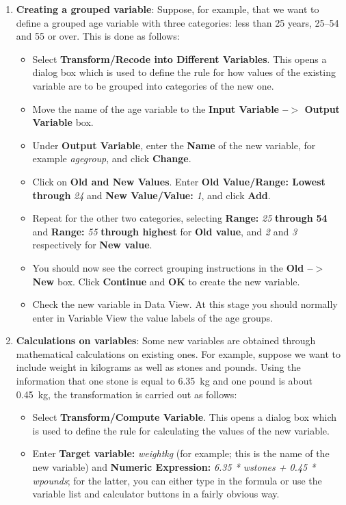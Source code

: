 \begin{enumerate}
\begin{enumerate}
\item
\textbf{Creating a grouped variable}:
Suppose, for example, that we want to define a grouped age variable
with three categories: less than 25 years, 25--54 and 55 or over. This is done
as follows:
\begin{itemize}
\item
Select \textbf{Transform/Recode into Different
Variables}. This opens a dialog box which is used to define the rule for
how values of the existing variable are to be grouped
into categories of the new one.
\item
Move the name of the age
variable to the \textbf{Input Variable --$>$ Output Variable} box.
\item
Under \textbf{Output Variable}, enter
the \textbf{Name} of the new variable, for example
\emph{agegroup}, and click \textbf{Change}.
\item
Click on \textbf{Old and New Values}. Enter \textbf{Old Value/Range:
Lowest through} \emph{24} and \textbf{New Value/Value:} \emph{1}, and
click \textbf{Add}.
\item
Repeat for the other two categories, selecting
\textbf{Range:} \emph{25} \textbf{through} \textbf{54} and
\textbf{Range:} \emph{55} \textbf{through highest}
for \textbf{Old value}, and \emph{2} and \emph{3} respectively
for \textbf{New value}.
\item
You should now see the correct grouping instructions in the \textbf{Old
--$\mathbf{>}$ New} box. Click \textbf{Continue} and \textbf{OK} to
create the new variable.
\item
Check the new variable in Data View. At this stage
you should normally enter in Variable View the value labels of the age
groups.
\end{itemize}
\item
\textbf{Calculations on variables}: Some new variables are obtained
through mathematical calculations on existing ones. For example, suppose
we want to include weight in kilograms as well as stones and pounds.
Using the information that one stone is equal to 6.35~kg and one pound
is about 0.45~kg, the transformation is carried out as follows:
\begin{itemize}
\item
Select \textbf{Transform/Compute Variable}. This opens a dialog box which is
used to define the rule for calculating the values of the new variable.
\item
Enter \textbf{Target variable:} \emph{weightkg} (for example; this is
the name of the new variable) and
\textbf{Numeric Expression:} \emph{6.35 * wstones + 0.45 * wpounds}; for
the latter, you can either type in the formula or use the variable list and
calculator buttons in a fairly obvious way.
\end{itemize}
\end{enumerate}
\end{enumerate}

